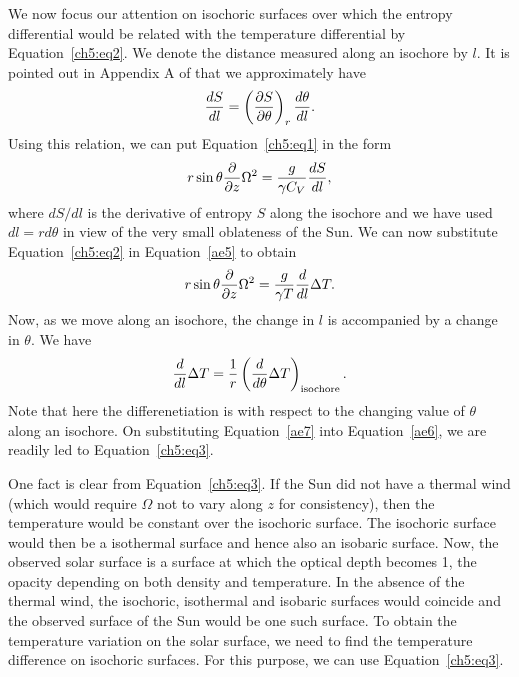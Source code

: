 We now focus our attention on isochoric surfaces over which the entropy differential would
be related with the temperature differential by Equation~\ref{ch5:eq2}.
We denote the distance measured along an isochore by $l$. It is pointed out in Appendix A of \citet{Choudhuri2021a} that we approximately have
%
\begin{equation}
\frac{dS}{dl} = \left( \frac{\partial S}{\partial \theta}\right)_r \frac{d \theta}{d l}. 
\label{ae4}
\end{equation}
Using this relation, we can put Equation~\ref{ch5:eq1} in the form
\begin{equation}
r \sin \theta \frac{\partial}{\partial z} \Omega^2 = \frac{g}{\gamma C_V} \frac{d S}{d l}, 
\label{ae5}
\end{equation}
where $d S/ dl$ is the derivative of entropy $S$ along the isochore and we have used $d l = r d \theta$
in view of the very small oblateness of the Sun.  
We can now substitute Equation~\ref{ch5:eq2} in Equation~\ref{ae5} to obtain
%
\begin{equation}
r \sin \theta \frac{\partial}{\partial z} \Omega^2 = \frac{g}{\gamma T} \frac{d}{d l} \Delta T.
\label{ae6}
\end{equation}
Now, as we move along an isochore, the change in $l$ 
is accompanied by a change in $\theta$.  We have
\begin{equation}
\frac{d}{d l} \Delta T = \frac{1}{r}
\left(\frac{d}{d \theta} \Delta T \right)_{\rm isochore}.
\label{ae7}
\end{equation}
Note that here the differenetiation is with respect to
the changing value of $\theta$ along an isochore.
On substituting Equation~\ref{ae7} into Equation~\ref{ae6}, we are readily led to Equation~\ref{ch5:eq3}. 

One fact is clear from Equation~\ref{ch5:eq3}.  If the Sun did not have a thermal wind (which would require $\Omega$
not to vary along $z$ for consistency), then the temperature would be constant over the
isochoric surface.  The isochoric surface would then be a isothermal surface and hence also an
isobaric surface.  Now,
the observed solar surface is a surface at which the optical depth becomes 1, the opacity
depending on both density and temperature. In the absence of the thermal wind, the isochoric, isothermal
and isobaric surfaces would coincide and the observed surface of the Sun would be one such surface.
To obtain the temperature variation on the solar surface, we need to find the temperature difference
on isochoric surfaces.  For this purpose, we can use Equation~\ref{ch5:eq3}.

